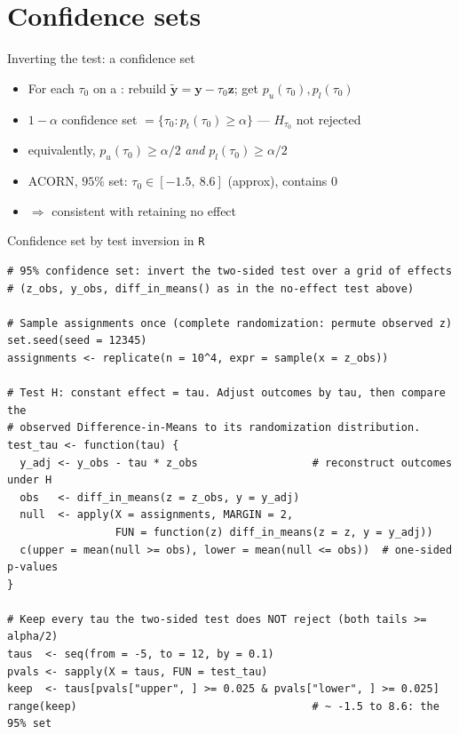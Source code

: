 \documentclass[table, xcolor = {dvipsnames}, 9pt]{beamer}
\theoremstyle{plain}
\newcommand{\mh}[1]{{\color{magenta}{#1}}}
\begin{document}
\section{Confidence sets}
\begin{frame}[t]{Inverting the test: a confidence set}
\vfill
\begin{itemize} \vfill
\item For each $\tau_0$ on a \mh{grid}: rebuild $\tilde{\bm{y}} = \bm{y} - \tau_0\bm{z}$; get $p_u(\tau_0), p_l(\tau_0)$ \vfill
\item $1-\alpha$ confidence set $= \{\tau_0 : p_t(\tau_0) \geq \alpha\}$ --- $H_{\tau_0}$ not rejected \vfill
\item[] equivalently, $p_u(\tau_0) \geq \alpha/2$ \emph{and} $p_l(\tau_0) \geq \alpha/2$ \vfill
\item ACORN, $95\%$ set: $\tau_0 \in [-1.5,\ 8.6]$ (approx), contains $0$ \vfill
\item[] $\Rightarrow$ consistent with retaining no effect \vfill
\end{itemize} \vfill
\end{frame}
\begin{frame}[fragile]{Confidence set by test inversion in \texttt{R}}
\begin{lstlisting}[style=Rstyle, basicstyle=\ttfamily\tiny, frame=single]
# 95% confidence set: invert the two-sided test over a grid of effects
# (z_obs, y_obs, diff_in_means() as in the no-effect test above)

# Sample assignments once (complete randomization: permute observed z)
set.seed(seed = 12345)
assignments <- replicate(n = 10^4, expr = sample(x = z_obs))

# Test H: constant effect = tau. Adjust outcomes by tau, then compare the
# observed Difference-in-Means to its randomization distribution.
test_tau <- function(tau) {
  y_adj <- y_obs - tau * z_obs                  # reconstruct outcomes under H
  obs   <- diff_in_means(z = z_obs, y = y_adj)
  null  <- apply(X = assignments, MARGIN = 2,
                 FUN = function(z) diff_in_means(z = z, y = y_adj))
  c(upper = mean(null >= obs), lower = mean(null <= obs))  # one-sided p-values
}

# Keep every tau the two-sided test does NOT reject (both tails >= alpha/2)
taus  <- seq(from = -5, to = 12, by = 0.1)
pvals <- sapply(X = taus, FUN = test_tau)
keep  <- taus[pvals["upper", ] >= 0.025 & pvals["lower", ] >= 0.025]
range(keep)                                     # ~ -1.5 to 8.6: the 95% set
\end{lstlisting}
\end{frame}
\end{document}
